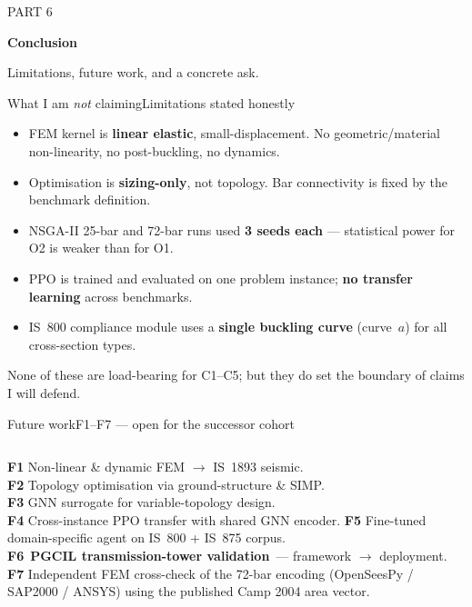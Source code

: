 \documentclass[aspectratio=169]{beamer}
\newcommand{\sectioncover}[3]{%
  \begingroup
  \setbeamertemplate{footline}{}
  \setbeamertemplate{frametitle}{}
  \begin{frame}[plain]
    \vspace*{0.3cm}
    \begin{minipage}{\linewidth}
      \raggedright
      {\fontsize{10}{12}\selectfont\color{inkmuted}\MakeUppercase{Part #1}\par}
      \vspace{0.8em}
      {\fontsize{38}{44}\selectfont\bfseries\color{ink}#2\par}
      \vspace{0.6em}
      {\fontsize{14}{18}\selectfont\color{inkmuted}#3\par}
    \end{minipage}
  \end{frame}
  \endgroup
}
\newcommand{\pillred}[1]{\colorbox{hiwarn!15}{\textcolor{hiwarn}{\footnotesize\bfseries\,#1\,}}}
\begin{document}
\sectioncover{6}{Conclusion}{Limitations, future work, and a concrete ask.}

\begin{frame}{What I am \emph{not} claiming}{Limitations stated honestly}
  \small
  \begin{itemize}
    \item FEM kernel is \textbf{linear elastic}, small-displacement. No geometric/material non-linearity, no post-buckling, no dynamics.
    \item Optimisation is \textbf{sizing-only}, not topology. Bar connectivity is fixed by the benchmark definition.
    \item NSGA-II 25-bar and 72-bar runs used \textbf{3 seeds each} --- statistical power for O2 is weaker than for O1.
    \item PPO is trained and evaluated on one problem instance; \textbf{no transfer learning} across benchmarks.
    \item IS~800 compliance module uses a \textbf{single buckling curve} (curve~$a$) for all cross-section types.
  \end{itemize}
  \vspace{0.4em}
  \color{inkmuted}\footnotesize None of these are load-bearing for C1--C5; but they do set the boundary of claims I will defend.
\end{frame}

\begin{frame}{Future work}{F1--F7 --- open for the successor cohort}
  \small
  \begin{columns}[T,onlytextwidth]
      \textbf{F1} Non-linear \& dynamic FEM $\to$ IS~1893 seismic.\\[0.4em]
      \textbf{F2} Topology optimisation via ground-structure \& SIMP.\\[0.4em]
      \textbf{F3} GNN surrogate for variable-topology design.\\[0.4em]
      \textbf{F4} Cross-instance PPO transfer with shared GNN encoder.
      \textbf{F5} Fine-tuned domain-specific agent on IS~800 + IS~875 corpus.\\[0.4em]
      \textbf{F6} \pillred{PGCIL transmission-tower validation} --- framework $\to$ deployment.\\[0.4em]
      \textbf{F7} Independent FEM cross-check of the 72-bar encoding (OpenSeesPy / SAP2000 / ANSYS) using the published Camp 2004 area vector.
  \end{columns}
\end{frame}
\end{document}
